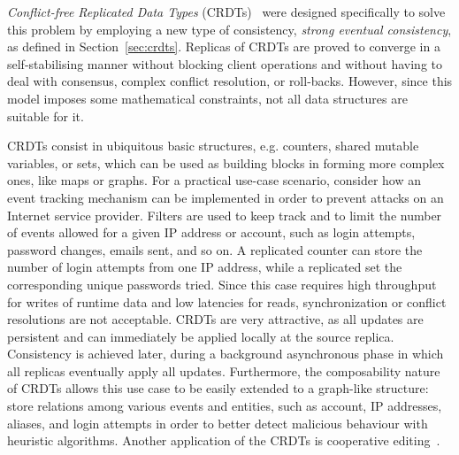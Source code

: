 \textit{Conflict-free Replicated Data Types}
(CRDTs)~\cite{Shapiro:2011:CRD:2050613.2050642} were designed specifically to
solve this problem by employing a new type of consistency, \textit{strong
eventual consistency}, as defined in Section~\ref{sec:crdts}. Replicas of CRDTs
are proved to converge in a self-stabilising manner without blocking client
operations and without having to deal with consensus, complex conflict
resolution, or roll-backs. However, since this model imposes some mathematical
constraints, not all data structures are suitable for it.

CRDTs consist in ubiquitous basic structures, e.g. counters, shared mutable
variables, or sets, which can be used as building blocks in forming more complex
ones, like maps or graphs. For a practical use-case scenario, consider how an
event tracking mechanism can be implemented in order to prevent attacks on an
Internet service provider. Filters are used to keep track and to limit the
number of events allowed for a given IP address or account, such as login
attempts, password changes, emails sent, and so on. A replicated counter can
store the number of login attempts from one IP address, while a replicated set
the corresponding unique passwords tried. Since this case requires high
throughput for writes of runtime data and low latencies for reads,
synchronization or conflict resolutions are not acceptable. CRDTs are very
attractive, as all updates are persistent and can immediately be applied locally
at the source replica. Consistency is achieved later, during a background
asynchronous phase in which all replicas eventually apply all updates.
Furthermore, the composability nature of CRDTs allows this use case to be easily
extended to a graph-like structure: store relations among various events and
entities, such as account, IP addresses, aliases, and login attempts in order to
better detect malicious behaviour with heuristic algorithms. Another application
of the CRDTs is cooperative editing~\cite{Preguica:2009:CRD:1584339.1584604}.

